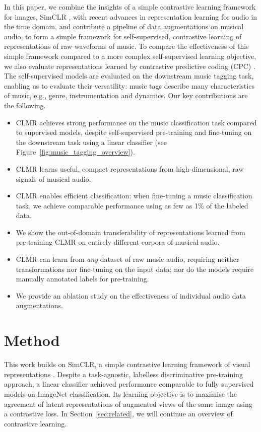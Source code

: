 \documentclass{article}
\begin{document}
In this paper, we combine the insights of a simple contrastive learning framework for images, SimCLR \cite{chen_simple_2020}, with recent advances in representation learning for audio in the time domain, and contribute a pipeline of data augmentations on musical audio, to form a simple framework for self-supervised, contrastive learning of representations of raw waveforms of music.
To compare the effectiveness of this simple framework compared to a more complex self-supervised learning objective, we also evaluate representations learned by contrastive predictive coding (CPC) \cite{oord_representation_2019}.
The self-supervised models are evaluated on the downstream music tagging task, enabling us to evaluate their versatility: music tags describe many characteristics of music, e.g., genre, instrumentation and dynamics.
Our key contributions are the following.
\begin{itemize}[topsep=0pt, partopsep=0pt, leftmargin=13pt, parsep=0pt, itemsep=4pt]
    \item CLMR achieves strong performance on the music classification task compared to supervised models, despite self-supervised pre-training and fine-tuning on the downstream task using a linear classifier (see Figure~\ref{fig:music_tagging_overview}).
    \item CLMR learns useful, compact representations from high-dimensional, raw signals of musical audio.
    \item CLMR enables efficient classification: when fine-tuning a music classification task, we achieve comparable performance using as few as 1\% of the labeled data.
    \item We show the out-of-domain transferability of representations learned from pre-training CLMR on entirely different corpora of musical audio.
    \item CLMR can learn from \emph{any} dataset of raw music audio, requiring neither transformations nor fine-tuning on the input data; nor do the models require manually annotated labels for pre-training.
    \item We provide an ablation study on the effectiveness of individual audio data augmentations.
\end{itemize}
 \section{Method}
\label{sec:method}
This work builds on SimCLR, a simple contrastive learning framework of visual representations \cite{chen_simple_2020}. Despite a task-agnostic, labelless discriminative pre-training approach, a linear classifier achieved performance comparable to fully supervised models on ImageNet classification.
Its learning objective is to maximise the agreement of latent representations of augmented views of the same image using a contrastive loss.
In Section~\ref{sec:related}, we will continue an overview of contrastive learning.
\end{document}
